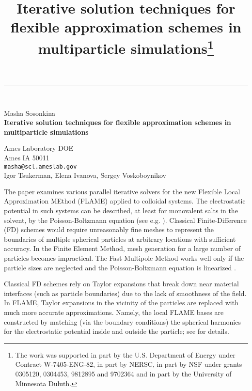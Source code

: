 \documentclass{report}
\begin{document}
\begin{center}
\rule{6in}{1pt} \

\title{
Iterative solution techniques for flexible approximation schemes in
multiparticle simulations\thanks{The work was supported in part
by the U.S.  Department of Energy under Contract W-7405-ENG-82, 
in part by NERSC, in part by NSF under grants 0305120, 0304453, 9812895
and 9702364 and in part by the University of Minnesota Duluth.}}

{\large Masha Sosonkina \\
{\bf Iterative solution techniques for flexible approximation schemes in
multiparticle simulations}}

Ames Laboratory DOE \\ Ames IA 50011 \\
{\tt  masha@scl.ameslab.gov} \\
Igor Tsukerman,
Elena Ivanova,
Sergey Voskoboynikov
\end{center}


The paper examines various parallel iterative solvers for the new Flexible
Local Approximation MEthod (FLAME) \cite{Tsukerman05, Tsukerman06}
applied to colloidal systems. The electrostatic potential in such  systems
can be described, at least for monovalent salts in the solvent, by the
Poisson-Boltzmann equation (see e.g. \cite{Grosberg02}). Classical
Finite-Difference (FD) schemes would require unreasonably fine meshes to
represent the boundaries of multiple spherical particles at arbitrary
locations with sufficient accuracy. In the Finite Element Method, mesh
generation for a large number of particles becomes impractical. The Fast
Multipole Method works well only if the particle sizes are neglected and 
the Poisson-Boltzmann equation is linearized \cite{Greengard02}.

Classical FD schemes rely on Taylor expansions that break down near 
material interfaces (such as particle boundaries) due to the lack of 
smoothness  of the field. In FLAME, Taylor expansions in the vicinity 
of the particles  are
replaced with much more accurate approximations. Namely, the local FLAME
bases are constructed by matching (via the boundary conditions) the
spherical harmonics for the electrostatic potential inside and outside 
the particle; see \cite{Tsukerman05, Tsukerman06} for details.
\end{document}
